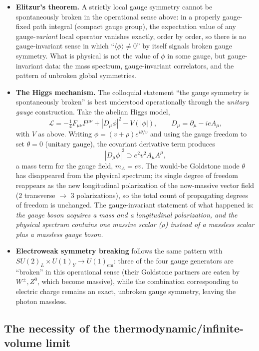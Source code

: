 \begin{itemize}
\item \textbf{Elitzur's theorem.} A strictly local gauge symmetry cannot be
    spontaneously broken in the operational sense above: in a properly
        gauge-fixed path integral (compact gauge group), the expectation value
        of any gauge-\emph{variant} local operator vanishes exactly, order by
        order, so there is no gauge-invariant sense in which
        ``$\langle\phi\rangle\neq0$'' by itself signals broken gauge symmetry.
        What is physical is not the value of $\phi$ in some gauge, but
        gauge-invariant data: the mass spectrum, gauge-invariant correlators,
        and the pattern of unbroken global symmetries.
\item \textbf{The Higgs mechanism.} The colloquial statement ``the gauge
    symmetry is spontaneously broken'' is best understood operationally through
        the \emph{unitary gauge} construction. Take the abelian Higgs model,
\[
\mathcal{L} = -\tfrac14 F_{\mu\nu}F^{\mu\nu} + |D_\mu\phi|^2 - V(|\phi|), \qquad D_\mu = \partial_\mu - i e A_\mu ,
\]
with $V$ as above. Writing $\phi=(v+\rho)e^{i\theta/v}$ and using the gauge
        freedom to set $\theta=0$ (unitary gauge), the covariant derivative
        term produces
\[
|D_\mu\phi|^2 \supset e^2v^2 A_\mu A^\mu ,
\]
a mass term for the gauge field, $m_A = ev$. The would-be Goldstone mode
        $\theta$ has disappeared from the physical spectrum; its single degree
        of freedom reappears as the new longitudinal polarization of the
        now-massive vector field (2 transverse $\to$ 3 polarizations), so the
        total count of propagating degrees of freedom is unchanged. The
        gauge-invariant statement of what happened is: \emph{the gauge boson
        acquires a mass and a longitudinal polarization, and the physical
        spectrum contains one massive scalar ($\rho$) instead of a massless
        scalar plus a massless gauge boson.}
\item \textbf{Electroweak symmetry breaking} follows the same pattern with
    $SU(2)_L\times U(1)_Y \to U(1)_{\text{em}}$: three of the four gauge
        generators are ``broken'' in this operational sense (their Goldstone
        partners are eaten by $W^\pm,Z^0$, which become massive), while the
        combination corresponding to electric charge remains an exact, unbroken
        gauge symmetry, leaving the photon massless.
\end{itemize}

\subsection{The necessity of the thermodynamic/infinite-volume limit}

